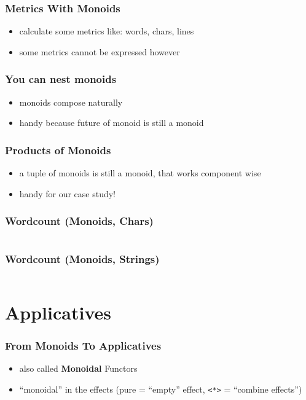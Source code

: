 \documentclass[aspectratio=169]{beamer}
\begin{document}
\begin{frame}
  \frametitle{Metrics With Monoids}
  \begin{itemize}
  \item calculate some metrics like: words, chars, lines
  \item some metrics cannot be expressed however
  \end{itemize}
\end{frame}

\begin{frame}
  \frametitle{You can nest monoids}
  \begin{itemize}
  \item monoids compose naturally
  \item handy because future of monoid is still a monoid
  \end{itemize}
\end{frame}

\begin{frame}
  \frametitle{Products of Monoids}
  \begin{itemize}
  \item a tuple of monoids is still a monoid, that works component wise
  \item handy for our case study!
  \end{itemize}
\end{frame}

\begin{frame}
  \frametitle{Wordcount (Monoids, Chars)}
  \inputminted[fontsize=\footnotesize]{scala}{snippets/wc-monoid-char.scala}
\end{frame}

\begin{frame}
  \frametitle{Wordcount (Monoids, Strings)}
  \inputminted[fontsize=\footnotesize]{scala}{snippets/wc-monoid-string.scala}
\end{frame}

\section{Applicatives}\label{sec:applicatives}

\begin{frame}
  \frametitle{From Monoids To Applicatives}
  \begin{itemize}
  \item also called \textbf{Monoidal} Functors
  \item ``monoidal'' in the effects (pure = ``empty'' effect, \texttt{<*>} = ``combine effects'')
  \end{itemize}
\end{frame}
\end{document}
